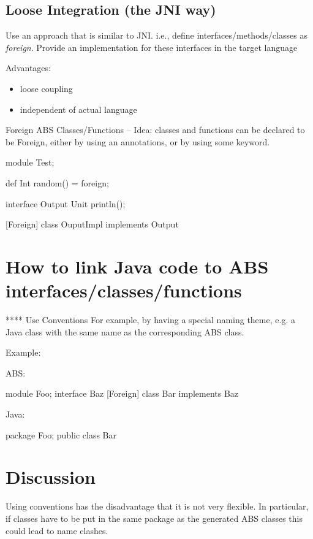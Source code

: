 \documentclass[a4paper,11pt,final]{article}
\begin{document}
\subsection{Loose Integration (the JNI way)}
Use an approach that is similar to JNI. i.e., define interfaces/methods/classes
as \emph{foreign}. Provide an implementation for these interfaces in the
target language 

\noindent Advantages: 
\begin{itemize}
  \item loose coupling
  \item independent of actual language 
\end{itemize}


\noindent Foreign ABS Classes/Functions -- Idea: classes and functions can be
declared to be Foreign, either by using an annotations, or by using some keyword.

\begin{absexamplen}
module Test;

def Int random() = foreign;

interface Output {
  Unit println();
}

[Foreign]
class OuputImpl implements Output { }
\end{absexamplen}

\section{How to link Java code to ABS interfaces/classes/functions}

**** Use Conventions
     For example, by having a special naming theme,
     e.g. a Java class with the same name as the corresponding
     ABS class.

     Example:
     
     ABS:

     module Foo;
     interface Baz { }
     [Foreign] class Bar implements Baz { }

     Java:

     package Foo;
     public class Bar {
     
     }

\section{Discussion}
Using conventions has the disadvantage that it is not very flexible. In
particular, if classes have to be put in the same package as the generated ABS
classes this could lead to name clashes.
      
\end{document}
